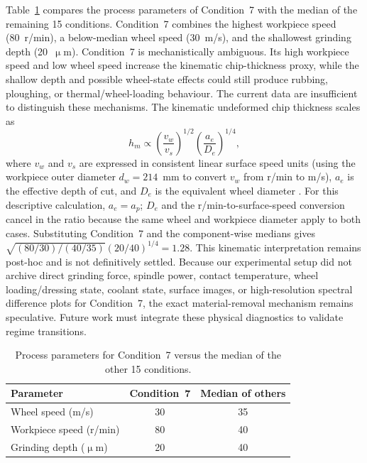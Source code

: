 Table~\ref{tbl:condition-seven} compares the process parameters of
Condition~7 with the median of the remaining 15 conditions. Condition~7
combines the highest workpiece speed (80~r/min), a below-median wheel speed
(30~m/s), and the shallowest grinding depth (20~\(\upmu\)m). Condition~7 is
mechanistically ambiguous. Its high workpiece speed and low wheel speed
increase the kinematic chip-thickness proxy, while the shallow depth and
possible wheel-state effects could still produce rubbing, ploughing, or
thermal/wheel-loading behaviour. The current data are insufficient to
distinguish these mechanisms. The kinematic undeformed chip thickness scales as
\begin{equation}
h_m \propto \left(\frac{v_w}{v_s}\right)^{1/2}\left(\frac{a_e}{D_e}\right)^{1/4},
\label{eq:chip-thickness}
\end{equation}
where \(v_w\) and \(v_s\) are expressed in consistent linear surface speed units (using the workpiece outer diameter \(d_w = 214\)~mm to convert \(v_w\) from r/min to m/s), \(a_e\) is the effective depth of cut, and \(D_e\) is the
equivalent wheel diameter \cite{tonshoff1992acoustic}. For this descriptive calculation, \(a_e=a_p\); \(D_e\) and the r/min-to-surface-speed conversion cancel in the ratio because the same wheel and workpiece diameter apply to both cases. Substituting Condition~7 and the component-wise medians gives
\(\sqrt{(80/30)/(40/35)}(20/40)^{1/4}=1.28\).
This kinematic interpretation remains
post-hoc and is not definitively settled. Because our experimental setup
did not archive direct grinding force, spindle power, contact temperature,
wheel loading/dressing state, coolant state, surface images, or
high-resolution spectral difference plots for Condition~7, the exact
material-removal mechanism remains speculative. Future work must integrate
these physical diagnostics to validate regime transitions.

\begin{table}[htbp]
\centering
\caption{Process parameters for Condition~7 versus the median of the
other 15 conditions.}\label{tbl:condition-seven}
\begin{tabular}{@{}lcc@{}}
\toprule
Parameter & Condition~7 & Median of others \\
\midrule
Wheel speed (m/s) & 30 & 35 \\
Workpiece speed (r/min) & 80 & 40 \\
Grinding depth (\(\upmu\)m) & 20 & 40 \\
\bottomrule
\end{tabular}
\end{table}

